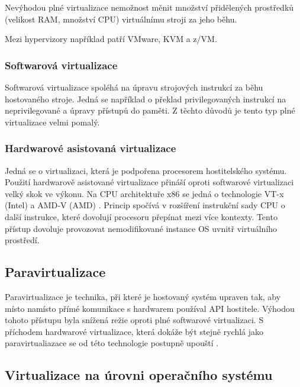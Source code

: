 Nevýhodou plné virtualizace nemožnost měnit množství přidělených prostředků (velikost RAM, množství CPU) virtuálnímu stroji za jeho běhu.

Mezi hypervizory například patří VMware, KVM a z/VM.

\subsubsection{Softwarová virtualizace}

Softwarová virtualizace spoléhá na úpravu strojových instrukcí za běhu hostovaného stroje.
Jedná se například o překlad privilegovaných instrukcí na neprivilegované a úpravy přístupů do paměti.
Z těchto důvodů je tento typ plné virtualizace velmi pomalý.

\subsubsection{Hardwarové asistovaná virtualizace}

Jedná se o virtualizaci, která je podpořena procesorem hostitelského systému.
Použití hardwarově asistované virtualizace přináší oproti softwarové virtualizaci velký skok ve výkonu.
Na CPU architektuře x86 se jedná o technologie VT-x (Intel) \cite{vt_x} a AMD-V (AMD) \cite{amd_v}.
Princip spočívá v rozšíření instrukční sady CPU o další instrukce, které dovolují procesoru přepínat mezi více kontexty.
Tento přístup dovoluje provozovat nemodifikované instance OS uvnitř virtuálního prostředí.

\subsection{Paravirtualizace}

Paravirtualizace je technika, při které je hostovaný systém upraven tak, aby místo namísto přímé komunikace s hardwarem používal API hostitele.
Výhodou tohoto přístupu byla snížená režie oproti plné softwarové virtualizaci.
S příchodem hardwarové virtualizace, která dokáže být stejně rychlá jako paravirtualiazace se od této technologie postupně upouští \cite{paravirtualization_leave}.


\subsection{Virtualizace na úrovni operačního systému}

